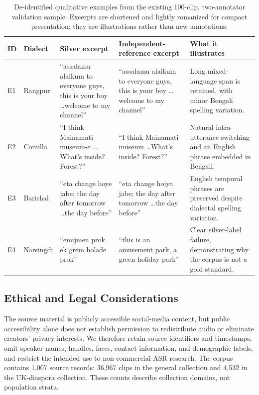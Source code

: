 \documentclass[journal]{IEEEtran}
\begin{document}
\begin{table}[t]
\caption{De-identified qualitative examples from the existing 100-clip,
two-annotator validation sample. Excerpts are shortened and lightly romanized
for compact presentation; they are illustrations rather than new annotations.}
\label{tab:datasetexamples}
\centering\scriptsize
\renewcommand{\arraystretch}{1.15}
\begin{tabular}{@{}lp{1.45cm}p{4.0cm}p{4.0cm}p{3.25cm}@{}}
\toprule
\textbf{ID} & \textbf{Dialect} & \textbf{Silver excerpt} &
\textbf{Independent-reference excerpt} & \textbf{What it illustrates} \\
\midrule
E1 & Rangpur &
``assalamu alaikum to everyone guys, this is your boy \ldots welcome to my channel'' &
``assalamu alaikum to everyone guys, this is your boy \ldots welcome to my channel'' &
Long mixed-language span is retained, with minor Bengali spelling variation. \\
E2 & Comilla &
``I think Mainamati museum-e \ldots What's inside? Forest?'' &
``I think Mainamati museum \ldots What's inside? Forest?'' &
Natural intra-utterance switching and an English phrase embedded in Bengali. \\
E3 & Barishal &
``eta change hoye jabe; the day after tomorrow \ldots the day before'' &
``eta change hoiya jabe; the day after tomorrow \ldots the day before'' &
English temporal phrases are preserved despite dialectal spelling variation. \\
E4 & Narsingdi &
``emijmen prok ek grem holade prok'' &
``this is an amusement park, a green holiday park'' &
Clear silver-label failure, demonstrating why the corpus is not a gold standard. \\
\bottomrule
\end{tabular}
\end{table}

\subsection{Ethical and Legal Considerations}
The source material is publicly accessible social-media content, but public accessibility alone does not establish permission to redistribute audio or eliminate creators' privacy interests. We therefore retain source identifiers and timestamps, omit speaker names, handles, faces, contact information, and demographic labels, and restrict the intended use to non-commercial ASR research. The corpus contains 1{,}007 source records: 36{,}967 clips in the general collection and 4{,}532 in the UK-diaspora collection. These counts describe collection domains, not population strata.
\end{document}
